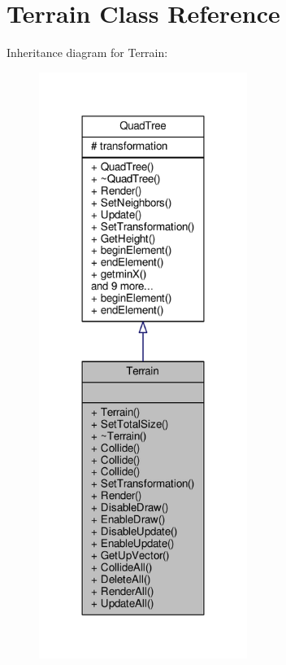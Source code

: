 \hypertarget{classTerrain}{}\section{Terrain Class Reference}
\label{classTerrain}


Inheritance diagram for Terrain\+:
\nopagebreak
\begin{figure}[H]
\begin{center}
\leavevmode
\includegraphics[width=192pt]{d9/dfd/classTerrain__inherit__graph}
\end{center}
\end{figure}


